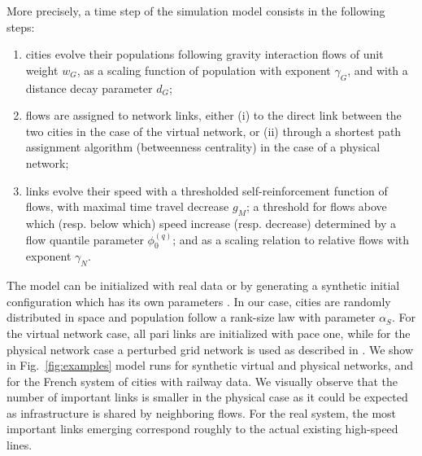 \documentclass[english,fleqn,allpages]{ISTE_science}[2018/07/30]
\begin{document}
More precisely, a time step of the simulation model consists in the following steps:
\begin{enumerate}
	\item cities evolve their populations following gravity interaction flows of unit weight $w_G$, as a scaling function of population with exponent $\gamma_G$, and with a distance decay parameter $d_G$;
	\item flows are assigned to network links, either (i) to the direct link between the two cities in the case of the virtual network, or (ii) through a shortest path assignment algorithm (betweenness centrality) in the case of a physical network;
	\item links evolve their speed with a thresholded self-reinforcement function of flows, with maximal time travel decrease $g_M$; a threshold for flows above which (resp. below which) speed increase (resp. decrease) determined by a flow quantile parameter $\phi^{(q)}_0$; and as a scaling relation to relative flows with exponent $\gamma_N$.
\end{enumerate}

The model can be initialized with real data or by generating a synthetic initial configuration which has its own parameters \citep{raimbault2019space}. In our case, cities are randomly distributed in space and population follow a rank-size law with parameter $\alpha_S$. For the virtual network case, all pari links are initialized with pace one, while for the physical network case a perturbed grid network is used as described in \cite{raimbault2018modeling}. We show in Fig.~\ref{fig:examples} model runs for synthetic virtual and physical networks, and for the French system of cities with railway data. We visually observe that the number of important links is smaller in the physical case as it could be expected as infrastructure is shared by neighboring flows. For the real system, the most important links emerging correspond roughly to the actual existing high-speed lines.
\end{document}
